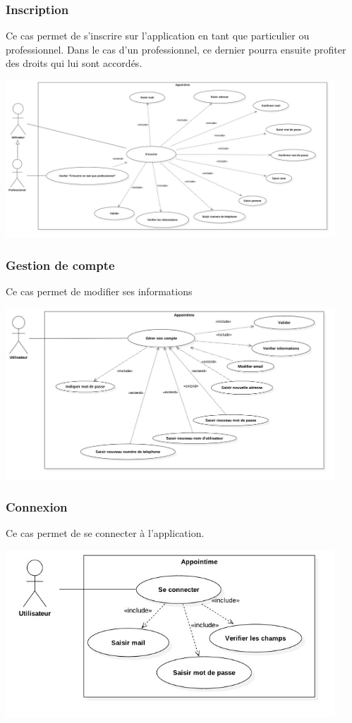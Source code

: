 \documentclass{article}
\begin{document}
\subsubsection{Inscription}
Ce cas permet de s'inscrire sur l'application en tant que particulier ou professionnel.
Dans le cas d'un professionnel, ce dernier pourra ensuite profiter des droits qui lui sont accordés.

\begin{center}
  \includegraphics[width=350pt]{diagram/useCaseInsc}
\end{center}


\subsubsection{Gestion de compte}
Ce cas permet de modifier ses informations
\begin{center}
  \includegraphics[width=350pt]{diagram/useCaseGererCompte}
\end{center}

\subsubsection{Connexion}
Ce cas permet de se connecter à l'application.
\begin{center}
  \includegraphics[width=350pt]{diagram/useCaseConnexion}
\end{center}
\end{document}
